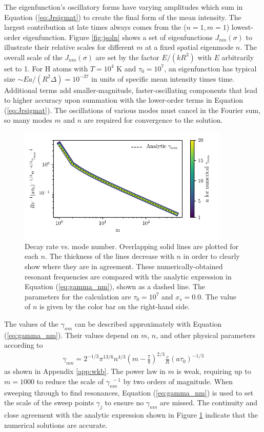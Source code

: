 \documentclass[linenumbers]{aastex63}
\newcommand{\be}{\begin{eqnarray}}
\newcommand{\ee}{\end{eqnarray}}
\begin{document}
The eigenfunction's oscillatory forms have varying amplitudes which sum in Equation (\ref{eq:Jrsigmat}) to create the final form of the mean intensity. The largest contribution at late times always comes from the ($n=1, m=1$) lowest-order eigenfunction. Figure \ref{fig:jsoln} shows a set of eigenfunctions $J_{nm}(\sigma)$ to illustrate their relative scales for different $m$ at a fixed spatial eigenmode $n$. The overall scale of the $J_{nm}(\sigma)$ are set by the factor $E/(kR^3)$ with $E$ arbitrarily set to 1. For H atoms with $T=10^4$ K and $\tau_0=10^7$, an eigenfunction has typical size ${\sim} E a / \left(R^2 \Delta \right) = 10^{-37}$ in units of specific mean intensity times time. Additional terms add smaller-magnitude, faster-oscillating components that lead to higher accuracy upon summation with the lower-order terms in Equation (\ref{eq:Jrsigmat}). The oscillations of various modes must cancel in the Fourier sum, so many modes $m$ and $n$ are required for convergence to the solution. 
\begin{figure}
    \centering
    \includegraphics[width=0.9\textwidth]{gamma_nm.pdf}
    \caption{Decay rate vs. mode number. Overlapping solid lines are plotted for each $n$. The thickness of the lines decrease with $n$ in order to clearly show where they are in agreement. These numerically-obtained resonant frequencies are compared with the analytic expression in Equation (\ref{eq:gamma_nm}), shown as a dashed line. The parameters for the calculation are $\tau_0=10^7$ and $x_s=0.0$. The value of $n$ is given by the color bar on the right-hand side.}
    \label{fig:gamma_nm}
\end{figure}
The values of the $\gamma_{nm}$ can be described approximately with Equation (\ref{eq:gamma_nm}). Their values depend on $m$, $n$, and other physical parameters according to 
\be \label{eq:gamma_nm}
\gamma_{nm} = 2^{-1/3} \pi^{13/6} n^{4/3}\left(m-\frac{7}{8}\right)^{2/3}\frac{c}{R}(a\tau_0)^{-1/3}
\ee
as shown in Appendix \ref{app:wkb}. The power law in $m$ is weak, requiring up to $m=1000$ to reduce the scale of $\gamma_{nm}^{\ \ -1}$ by two orders of magnitude. When sweeping through to find resonances, Equation (\ref{eq:gamma_nm}) is used to set the scale of the sweep points $\gamma_j$ to ensure no $\gamma_{nm}$ are missed. The continuity and close agreement with the analytic expression shown in Figure \ref{fig:gamma_nm} indicate that the numerical solutions are accurate.
\end{document}
